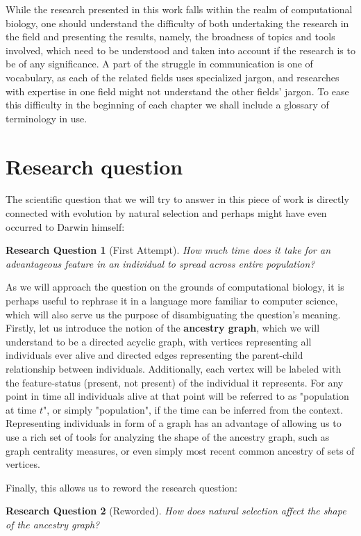 \documentclass{l4proj}
\newtheorem*{quest}{Research Question}
\begin{document}
While the research presented in this work falls within the realm of computational biology, one should understand the difficulty of both undertaking the research in the field and presenting the results, namely, the broadness of topics and tools involved, which need to be understood and taken into account if the research is to be of any significance. A part of the struggle in communication is one of vocabulary, as each of the related fields uses specialized jargon, and researches with expertise in one field might not understand the other fields' jargon. To ease this difficulty in the beginning of each chapter we shall include a glossary of terminology in use.

\section{Research question}
The scientific question that we will try to answer in this piece of work is directly connected with evolution by natural selection and perhaps might have even occurred to Darwin himself:

\begin{quest}[First Attempt]
How much time does it take for an advantageous feature in an individual to spread across entire population?
\end{quest}

As we will approach the question on the grounds of computational biology, it is perhaps useful to rephrase it in a language more familiar to computer science, which will also serve us the purpose of disambiguating the question's meaning. Firstly, let us introduce the notion of the \textbf{ancestry graph}, which we will understand to be a directed acyclic graph, with vertices representing all individuals ever alive and directed edges representing the parent-child relationship between individuals. Additionally, each vertex will be labeled with the feature-status (present, not present) of the individual it represents. For any point in time all individuals alive at that point will be referred to as "population at time $t$", or simply "population", if the time can be inferred from the context. Representing individuals in form of a graph has an advantage of allowing us to use a rich set of tools for analyzing the shape of the ancestry graph, such as graph centrality measures, or even simply most recent common ancestry of sets of vertices.

Finally, this allows us to reword the research question:

\begin{quest}[Reworded]
How does natural selection affect the shape of the ancestry graph?
\end{quest}
\end{document}
